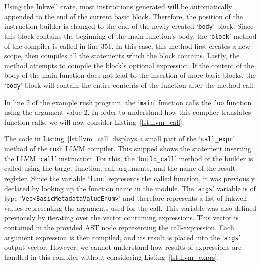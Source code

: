 Using the Inkwell crate, most instructions generated will be automatically appended to the end of the current basic block.
Therefore, the position of the instruction builder is changed to the end of the newly created `\texttt{body}' block.
Since this block contains the beginning of the main-function's body, the `\texttt{block}' method of the compiler is called in line 351.
In this case, this method first creates a new scope, then compiles all the statements which the block contains.
Lastly, the method attempts to compile the block's optional expression.
If the content of the body of the main-function does not lead to the insertion of more basic blocks,
the `\texttt{body}' block will contain the entire contents of the function after the method call.

In line 2 of the example rush program, the `\texttt{main}' function calls the \texttt{foo} function using the argument value 2.
In order to understand how this compiler translates function calls, we will now consider Listing~\ref{lst:llvm_call}.


The code in Listing~\ref{lst:llvm_call} displays a small part of the `\Verb|call_expr|' method of the rush LLVM compiler.
This snipped shows the statement inserting the LLVM `\texttt{call}' instruction.
For this, the `\Verb|build_call|' method of the builder is called using the target function, call arguments, and the name of the result register.
Since the variable `\texttt{func}' represents the called function, it was previously declared by looking up the function name in the module.
The `\texttt{args}' variable is of type `\Verb|Vec<BasicMetadataValueEnum>|' and therefore represents a list of Inkwell values representing the arguments used for the call.
This variable was also defined previously by iterating over the  vector containing expressions.
This vector is contained in the provided AST node representing the call-expression.
Each argument expression is then compiled, and its result is placed into the `\texttt{args}' output vector.
However, we cannot understand how results of expressions are handled in this compiler without considering Listing~\ref{lst:llvm_exprs}.


